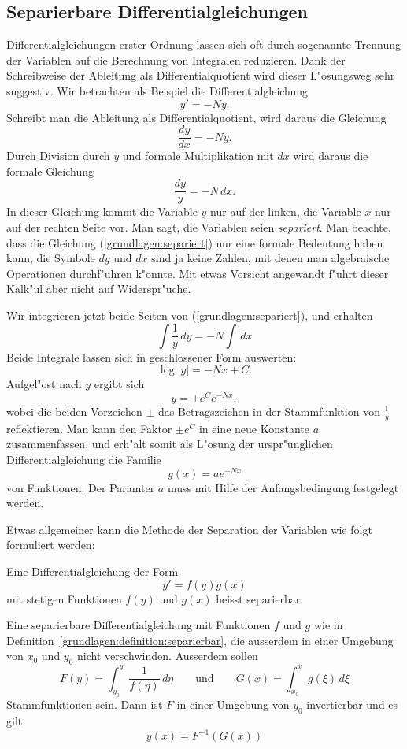 \subsection{Separierbare Differentialgleichungen}
Differentialgleichungen erster Ordnung lassen sich oft durch sogenannte
Trennung der Variablen auf die Berechnung von Integralen reduzieren.
Dank der Schreibweise der Ableitung als Differentialquotient wird
dieser L"osungsweg sehr suggestiv.
Wir betrachten als Beispiel die Differentialgleichung
\[
y'=-Ny.
\]
Schreibt man die Ableitung als Differentialquotient, wird daraus die
Gleichung
\[
\frac{dy}{dx}=-Ny.
\]
Durch Division durch $y$ und formale Multiplikation mit $dx$ wird daraus
die formale Gleichung
\begin{equation}
\frac{dy}{y}=-N\,dx.
\label{grundlagen:separiert}
\end{equation}
In dieser Gleichung kommt die Variable $y$ nur auf der linken, die Variable
$x$ nur auf der rechten Seite vor.
Man sagt, die Variablen seien {\em separiert}.
Man beachte, dass die Gleichung (\ref{grundlagen:separiert}) nur eine
formale Bedeutung haben kann, die Symbole $dy$ und $dx$ sind ja keine Zahlen,
mit denen man algebraische Operationen durchf"uhren k"onnte.
Mit etwas Vorsicht angewandt f"uhrt dieser Kalk"ul aber nicht auf
Widerspr"uche.

Wir integrieren jetzt beide Seiten von (\ref{grundlagen:separiert}), und
erhalten 
\[
\int\frac1y\,dy=-N\int\,dx
\]
Beide Integrale lassen sich in geschlossener Form auswerten:
\[
\log|y|=-Nx+C.
\]
Aufgel"ost nach $y$ ergibt sich
\[
y=\pm e^{C}e^{-Nx},
\]
wobei die beiden Vorzeichen $\pm$ das Betragszeichen in der Stammfunktion
von $\frac1y$ reflektieren.
Man kann den Faktor $\pm e^{C}$ in eine neue Konstante $a$ zusammenfassen,
und erh"alt somit als L"osung der urspr"unglichen Differentialgleichung
die Familie
\[
y(x)=ae^{-Nx}
\]
von Funktionen.
Der Paramter $a$ muss mit Hilfe der Anfangsbedingung festgelegt werden.

Etwas allgemeiner kann die Methode der Separation der Variablen wie folgt
formuliert werden:
\begin{definition}
\label{grundlagen:definition:separierbar}
Eine Differentialgleichung der Form
\[
y'=f(y) g(x)
\]
mit stetigen Funktionen $f(y)$ und $g(x)$ heisst separierbar.
\end{definition}

\begin{satz}
Eine separierbare Differentialgleichung mit Funktionen $f$ und $g$ wie
in Definition~\ref{grundlagen:definition:separierbar},
die ausserdem in einer Umgebung von $x_0$ und $y_0$ nicht verschwinden.
Ausserdem sollen
\[
F(y)=\int_{y_0}^y \frac1{f(\eta)}\,d\eta
\qquad\text{und}\qquad
G(x)=\int_{x_0}^x g(\xi)\,d\xi
\]
Stammfunktionen sein.
Dann ist $F$ in einer Umgebung von $y_0$ invertierbar und es gilt
\[
y(x)=F^{-1}(G(x))
\]
\end{satz}

